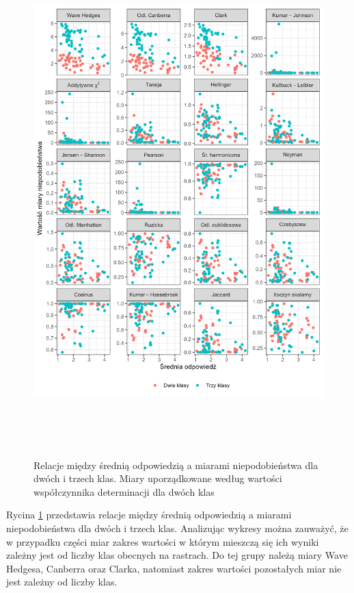\documentclass{amuthesis}
\begin{document}
\begin{figure}[t]

{\centering \includegraphics[width=5.72917in,height=7.72917in]{figures/avg_vs_measures.png}

}

\caption{\label{fig-avg_vs_measures}Relacje między średnią odpowiedzią a
miarami niepodobieństwa dla dwóch i trzech klas. Miary uporządkowane
według wartości współczynnika determinacji dla dwóch klas}

\end{figure}

Rycina \ref{fig-avg_vs_measures} przedstawia relacje między średnią
odpowiedzią a miarami niepodobieństwa dla dwóch i trzech klas.
Analizując wykresy można zauważyć, że w przypadku części miar zakres
wartości w którym mieszczą się ich wyniki zależny jest od liczby klas
obecnych na rastrach. Do tej grupy należą miary Wave Hedgesa, Canberra
oraz Clarka, natomiast zakres wartości pozostałych miar nie jest zależny
od liczby klas.
\end{document}
